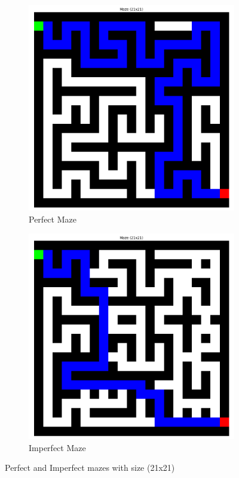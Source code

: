 \documentclass{article}
\begin{document}
\begin{figure}[h]
    \centering
    \begin{subfigure}[b]{0.45\textwidth}
        \centering
        \includegraphics[width=\textwidth]{PerfectMaze.png}
        \caption{Perfect Maze}
        \label{fig:perfectmaze}
    \end{subfigure}
    \hfill
    \begin{subfigure}[b]{0.45\textwidth}
        \centering
        \includegraphics[width=\textwidth]{ImperfectMaze.png}
        \caption{Imperfect Maze}
        \label{fig:imperfectmaze}
    \end{subfigure}
    \caption{Perfect and Imperfect mazes with size (21x21)}
    \label{fig:mazes}
\end{figure}
\end{document}
